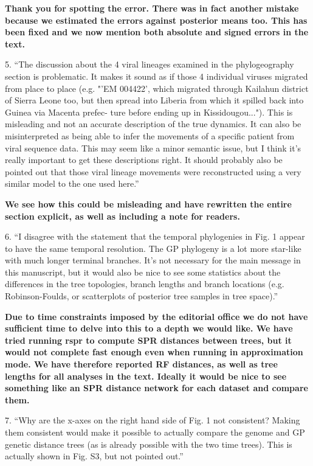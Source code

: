 \documentclass[11pt,oneside,letterpaper]{article}
\begin{document}
\textbf{Thank you for spotting the error. There was in fact another mistake because we estimated the errors against posterior means too. This has been fixed and we now mention both absolute and signed errors in the text.}

5. ``The discussion about the 4 viral lineages examined in the phylogeography section is problematic. It makes it sound as if those 4 individual viruses migrated from place to place (e.g. "'EM 004422', which migrated through Kailahun district of Sierra Leone too, but then spread into Liberia from which it spilled back into Guinea via Macenta prefec- ture before ending up in Kissidougou..."). This is misleading and not an accurate description of the true dynamics. It can also be misinterpreted as being able to infer the movements of a specific patient from viral sequence data. This may seem like a minor semantic issue, but I think it's really  important to get these descriptions right. It should probably also be pointed out that those viral lineage movements were reconstructed using a very similar model to the one used here.''

\textbf{We see how this could be misleading and have rewritten the entire section explicit, as well as including a note for readers.}

6. ``I disagree with the statement that the temporal phylogenies in Fig. 1 appear to have the same temporal resolution. The GP phylogeny is a lot more star-like with much longer terminal branches. It's not necessary for the main message in this manuscript, but it would also be nice to see some statistics about the differences in the tree topologies, branch lengths and branch locations (e.g. Robinson-Foulds, or scatterplots of posterior tree samples in tree space).''

\textbf{Due to time constraints imposed by the editorial office we do not have sufficient time to delve into this to a depth we would like. We have tried running rspr to compute SPR distances between trees, but it would not complete fast enough even when running in approximation mode. We have therefore reported RF distances, as well as tree lengths for all analyses in the text. Ideally it would be nice to see something like an SPR distance network for each dataset and compare them.}

7. ``Why are the x-axes on the right hand side of Fig. 1 not consistent? Making them consistent would make it possible to actually compare the genome and GP genetic distance trees (as is already possible with the two time trees). This is actually shown in Fig. S3, but not pointed out.''
\end{document}
